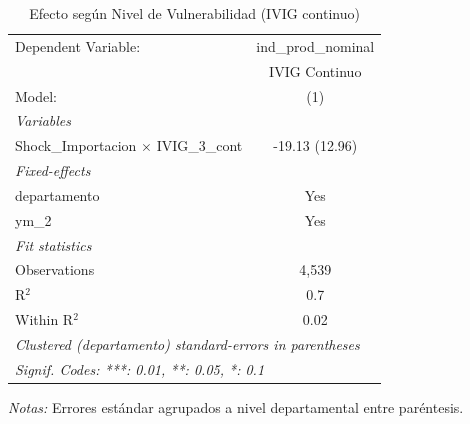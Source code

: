 \documentclass[12pt]{article}
\begin{document}
\setcounter{table}{9}
\begin{table}[htbp]
\centering
\begin{threeparttable}

   \caption{Efecto según Nivel de Vulnerabilidad (IVIG continuo)}
   \centering
   \small
   \begin{tabular}{lc}
      \tabularnewline \midrule \midrule
      Dependent Variable:                           & ind\_prod\_nominal\\    
                                                    & IVIG Continuo \\   
      Model:                                        & (1)\\  
      \midrule
      \emph{Variables}\\
      Shock\_Importacion $\times$ IVIG\_3\_cont     & -19.13 (12.96)\\   
      \midrule
      \emph{Fixed-effects}\\
      departamento                                  & Yes\\  
      ym\_2                                         & Yes\\  
      \midrule
      \emph{Fit statistics}\\
      Observations                                  & 4,539\\  
      R$^2$                                         & 0.7\\  
      Within R$^2$                                  & 0.02\\  
      \midrule \midrule
      \multicolumn{2}{l}{\emph{Clustered (departamento) standard-errors in parentheses}}\\
      \multicolumn{2}{l}{\emph{Signif. Codes: ***: 0.01, **: 0.05, *: 0.1}}\\
   \end{tabular}


\begin{tablenotes}
\footnotesize
\item \textit{Notas:} Errores estándar agrupados a nivel departamental entre paréntesis.
\end{tablenotes}
\end{threeparttable}
\end{table}
\end{document}
